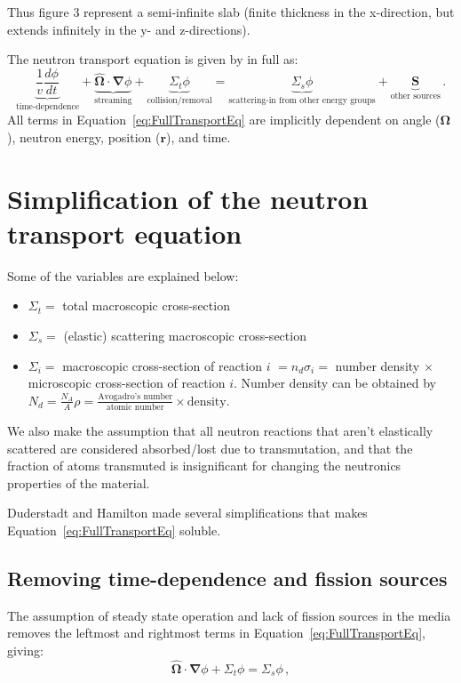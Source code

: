 \documentclass[a4paper, 12pt]{article}
\begin{document}
Thus figure 3 represent a semi-infinite slab (finite thickness in the x-direction, but extends infinitely in the y- and z-directions).

The neutron transport equation is given by \cite{Duderstadt} in full as:
\begin{equation}\label{eq:FullTransportEq}
    \underbrace{\frac{1}{v}\frac{d\phi}{dt}}_{\text{time-dependence}} +
    \underbrace{\hat{\boldsymbol{\Omega}}\cdot\boldsymbol{\nabla}\phi}_{\text{streaming}} +
    \underbrace{\Sigma_t \phi}_{\text{collision/removal}} =
    \underbrace{\Sigma_s \phi}_{\text{scattering-in from other energy groups}} +
    \underbrace{\boldsymbol{S}}_{\text{other sources}}\,.
\end{equation}
All terms in Equation~\ref{eq:FullTransportEq} are implicitly dependent on angle ($\boldsymbol{\Omega}$), neutron energy, position ($\boldsymbol{r}$), and time.

\section{Simplification of the neutron transport equation}
Some of the variables are explained below:
\begin{itemize}
    \item $\Sigma_t = $ total macroscopic cross-section
    \item $\Sigma_s = $ (elastic) scattering macroscopic cross-section
    \item $\Sigma_i = $ macroscopic cross-section of reaction $i$ $= n_d \sigma_i = $ number density $\times$ microscopic cross-section of reaction $i$. Number density can be obtained by $N_d=\frac{N_A}{A}\rho=\frac{\text{Avogadro's number}}{\text{atomic number}}\times\text{density}$.
\end{itemize}

We also make the assumption that all neutron reactions that aren't elastically scattered are considered absorbed/lost due to transmutation, and that the fraction of atoms transmuted is insignificant for changing the neutronics properties of the material.

Duderstadt and Hamilton made several simplifications that makes Equation~\ref{eq:FullTransportEq} soluble.

\subsection{Removing time-dependence and fission sources}
The assumption of steady state operation and lack of fission sources in the media removes the leftmost and rightmost terms in Equation~\ref{eq:FullTransportEq}, giving:
\begin{equation}\label{eq:TransportEq3Terms}
    \hat{\boldsymbol{\Omega}}\cdot\boldsymbol{\nabla}\phi + \Sigma_t \phi =\Sigma_s \phi\,,
\end{equation}
\end{document}
